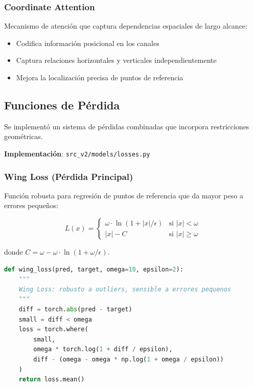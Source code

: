 \documentclass[12pt,a4paper]{article}
\newcommand{\code}[1]{\texttt{#1}}
\begin{document}
\subsubsection{Coordinate Attention}

Mecanismo de atención que captura dependencias espaciales de largo alcance:

\begin{itemize}
    \item Codifica información posicional en los canales
    \item Captura relaciones horizontales y verticales independientemente
    \item Mejora la localización precisa de puntos de referencia
\end{itemize}

\subsection{Funciones de Pérdida}

Se implementó un sistema de pérdidas combinadas que incorpora restricciones geométricas.

\textbf{Implementación}: \code{src\_v2/models/losses.py}

\subsubsection{Wing Loss (Pérdida Principal)}

Función robusta para regresión de puntos de referencia que da mayor peso a errores pequeños:

\begin{equation}
L(x) = \begin{cases}
\omega \cdot \ln(1 + |x|/\epsilon) & \text{si } |x| < \omega \\
|x| - C & \text{si } |x| \geq \omega
\end{cases}
\end{equation}

donde $C = \omega - \omega \cdot \ln(1 + \omega/\epsilon)$. \\


\begin{lstlisting}[language=Python]
def wing_loss(pred, target, omega=10, epsilon=2):
    """
    Wing Loss: robusto a outliers, sensible a errores pequenos
    """
    diff = torch.abs(pred - target)
    small = diff < omega
    loss = torch.where(
        small,
        omega * torch.log(1 + diff / epsilon),
        diff - (omega - omega * np.log(1 + omega / epsilon))
    )
    return loss.mean()
\end{lstlisting}
\end{document}
